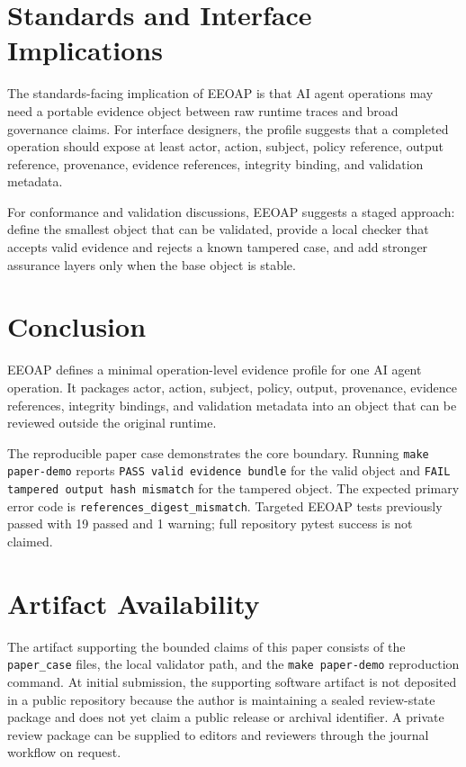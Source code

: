 \documentclass[11pt]{article}
\begin{document}
\section{Standards and Interface Implications}

The standards-facing implication of EEOAP is that AI agent operations may need
a portable evidence object between raw runtime traces and broad governance
claims. For interface designers, the profile suggests that a completed
operation should expose at least actor, action, subject, policy reference,
output reference, provenance, evidence references, integrity binding, and
validation metadata.

For conformance and validation discussions, EEOAP suggests a staged approach:
define the smallest object that can be validated, provide a local checker that
accepts valid evidence and rejects a known tampered case, and add stronger
assurance layers only when the base object is stable.

\section{Conclusion}

EEOAP defines a minimal operation-level evidence profile for one AI agent
operation. It packages actor, action, subject, policy, output, provenance,
evidence references, integrity bindings, and validation metadata into an
object that can be reviewed outside the original runtime.

The reproducible paper case demonstrates the core boundary. Running
\texttt{make paper-demo} reports \texttt{PASS valid evidence bundle} for the
valid object and \texttt{FAIL tampered output hash mismatch} for the tampered
object. The expected primary error code is
\texttt{references\_digest\_mismatch}. Targeted EEOAP tests previously passed
with 19 passed and 1 warning; full repository pytest success is not claimed.

\section{Artifact Availability}

The artifact supporting the bounded claims of this paper consists of the
\texttt{paper\_case} files, the local validator path, and the
\texttt{make paper-demo} reproduction command. At initial submission, the
supporting software artifact is not deposited in a public repository because
the author is maintaining a sealed review-state package and does not yet
claim a public release or archival identifier. A private review package can be
supplied to editors and reviewers through the journal workflow on request.
\end{document}
